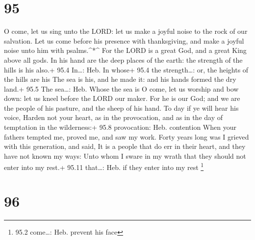 \hypertarget{section-94}{%
\section{95}\label{section-94}}

 O come, let us sing unto the LORD: let us make a joyful
noise to the rock of our salvation.  Let us come before his
presence with thanksgiving, and make a joyful noise unto him with
psalms.\^{}*\^{}  For the LORD is a great God, and a great
King above all gods.  In his hand are the deep places of the
earth: the strength of the hills is his also.+ 95.4 In\ldots: Heb. In
whose+ 95.4 the strength\ldots: or, the heights of the hills are his
 The sea is his, and he made it: and his hands formed the
dry land.+ 95.5 The sea\ldots: Heb. Whose the sea is  O
come, let us worship and bow down: let us kneel before the LORD our
maker.  For he is our God; and we are the people of his
pasture, and the sheep of his hand. To day if ye will hear his voice,
 Harden not your heart, as in the provocation, and as in the
day of temptation in the wilderness:+ 95.8 provocation: Heb. contention
 When your fathers tempted me, proved me, and saw my work.
 Forty years long was I grieved with this generation, and
said, It is a people that do err in their heart, and they have not known
my ways:  Unto whom I sware in my wrath that they should
not enter into my rest.+ 95.11 that\ldots: Heb. if they enter into my
rest \footnote{95.2 come\ldots: Heb. prevent his face}

\hypertarget{section-95}{%
\section{96}\label{section-95}}

